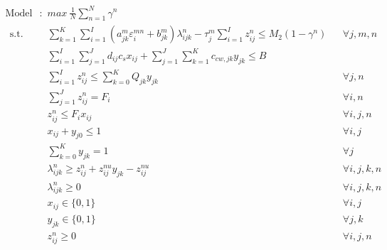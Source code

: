 \documentclass[preprint,12pt,authoryear]{elsarticle}
\begin{document}
\begin{equation*}\label{modelS1}
\begin{aligned}
	\text{Model S1}:~~&max ~ \frac{1}{N}\sum_{n=1}^N \gamma^n \\~~
	\mbox{s.t.}~~
	&\sum_{k=1}^K \sum_{i=1}^I (a_{jk}^m \varepsilon_i^{mn} + b_{jk}^m) \lambda_{ijk}^n - \tau_j^m \sum_{i=1}^I z_{ij}^n \leq M_2 (1-\gamma^n) && \forall j,m,n\\	
	&\sum_{i=1}^{I}\sum_{j=1}^{J}d_{ij}c_s x_{ij} + \sum_{j=1}^{J}\sum_{k=1}^{K}c_{cw,jk}y_{jk} \leq B && \\
 	&\sum_{i=1}^{I} z_{ij}^n \leq \sum_{k=0}^K Q_{jk} y_{jk} && \forall j,n\\
	&\sum_{j=1}^J z_{ij}^n = F_i && \forall i,n\\
	&z_{ij}^n \leq F_i x_{ij} && \forall i,j,n\\
	&x_{ij} + y_{j0} \leq 1 && \forall i,j\\
	&\sum_{k=0}^{K}y_{jk} = 1&&\forall j\\
	&\lambda_{ijk}^n \geq z_{ij}^n + z_{ij}^{nu} y_{jk} - z_{ij}^{nu} && \forall i,j,k,n\\
	&\lambda_{ijk}^n \geq 0 && \forall i,j,k,n\\
	&x_{ij} \in \{0,1\}&&\forall i,j\\
	&y_{jk} \in \{0,1\}&&\forall j,k\\
	&z_{ij}^n \geq 0&&\forall i,j,n\\ 
\end{aligned}
\end{equation*}
\newpage
\end{document}
